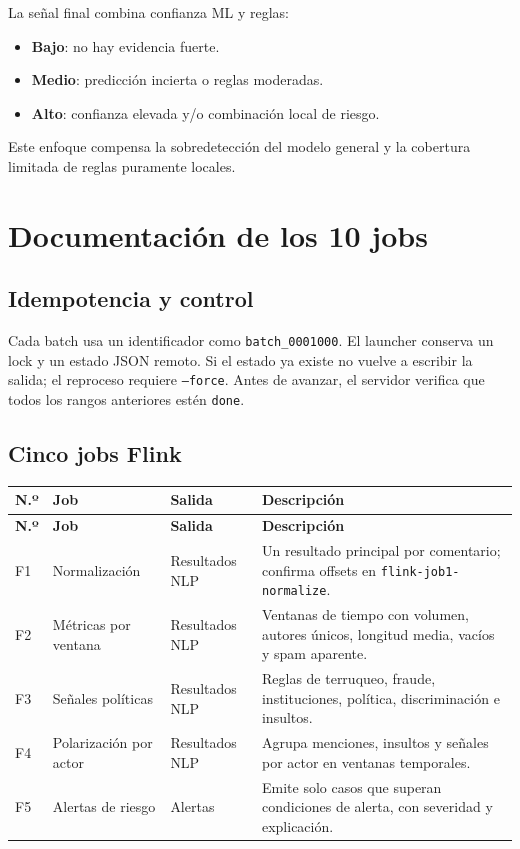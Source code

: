 \documentclass[11pt,a4paper,openany]{report}
\newcommand{\topic}[1]{\texttt{#1}}
\begin{document}
La señal final combina confianza ML y reglas:

\begin{itemize}
  \item \textbf{Bajo}: no hay evidencia fuerte.
  \item \textbf{Medio}: predicción incierta o reglas moderadas.
  \item \textbf{Alto}: confianza elevada y/o combinación local de riesgo.
\end{itemize}

Este enfoque compensa la sobredetección del modelo general y la cobertura limitada de reglas puramente locales.

\chapter{Documentación de los 10 jobs}

\section{Idempotencia y control}

Cada batch usa un identificador como \topic{batch\_0001000}. El launcher conserva un lock y un estado JSON remoto. Si el estado ya existe no vuelve a escribir la salida; el reproceso requiere \topic{--force}. Antes de avanzar, el servidor verifica que todos los rangos anteriores estén \topic{done}.

\section{Cinco jobs Flink}

\small
\begin{longtable}{p{0.7cm}p{2.8cm}p{3.0cm}p{7.4cm}}
\toprule
\textbf{N.º} & \textbf{Job} & \textbf{Salida} & \textbf{Descripción}\\
\midrule
\endfirsthead
\toprule
\textbf{N.º} & \textbf{Job} & \textbf{Salida} & \textbf{Descripción}\\
\midrule
\endhead
F1 & Normalización & Resultados NLP & Un resultado principal por comentario; confirma offsets en \topic{flink-job1-normalize}.\\
F2 & Métricas por ventana & Resultados NLP & Ventanas de tiempo con volumen, autores únicos, longitud media, vacíos y spam aparente.\\
F3 & Señales políticas & Resultados NLP & Reglas de terruqueo, fraude, instituciones, política, discriminación e insultos.\\
F4 & Polarización por actor & Resultados NLP & Agrupa menciones, insultos y señales por actor en ventanas temporales.\\
F5 & Alertas de riesgo & Alertas & Emite solo casos que superan condiciones de alerta, con severidad y explicación.\\
\bottomrule
\end{longtable}
\end{document}
